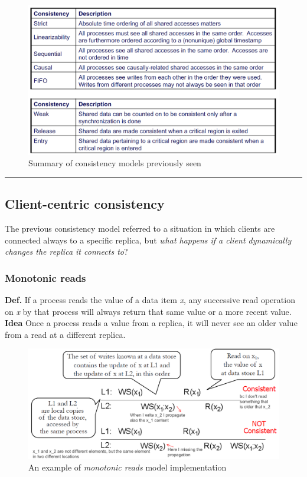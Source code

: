 \begin{figure}[htbp]
    \centering
    \includegraphics[width=\textwidth]{src/images/consistency-replication/summary.png}
    \caption{Summary of consistency models previously seen}
\end{figure}

\begin{center}\rule{3in}{0.4pt}\end{center}

\subsection{Client-centric consistency}

The previous consistency model referred to a situation in which clients are connected always
to a specific replica, but \textit{what happens if a client dynamically changes the replica
it connects to}?

\subsubsection{Monotonic reads}

\textbf{Def.} If a process reads the value of a data item \emph{x}, any
successive read operation on \emph{x} by that process will always return
that same value or a more recent value.\\
\textbf{Idea} Once a process reads a value from a replica, it will never
see an older value from a read at a different replica.

\begin{figure}[htbp]
    \centering
    \includegraphics[width=\textwidth]{src/images/consistency-replication/monotonic-reads.png}
    \caption{An example of \textit{monotonic reads} model implementation}
\end{figure}

